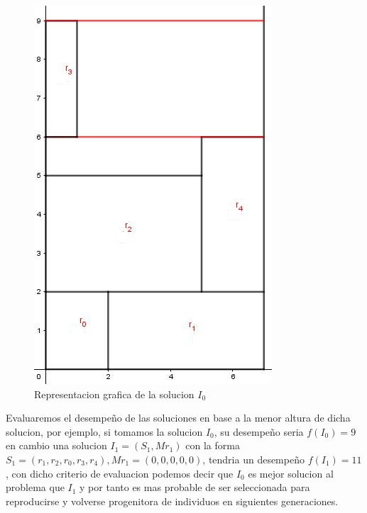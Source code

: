 \documentclass[10pt]{article}
\begin{document}
\begin{figure}[H]
\centerline{\includegraphics[width=0.7\linewidth]{grafica_ejemplo_solucion_GA.jpg}}
\caption{Representacion grafica de la solucion $I_0$}
\label{fig_1}
\end{figure}

Evaluaremos el desempeño de las soluciones en base a la menor altura de dicha solucion, por ejemplo, si tomamos la solucion $I_0$, su desempeño seria $f(I_0) = 9$ en cambio una solucion $I_1 = (S_1,Mr_1)$ con la forma $S_1 = (r_1,r_2,r_0,r_3,r_4), Mr_1 = (0,0,0,0,0)$, tendria un desempeño $f(I_1) = 11$, con dicho criterio de evaluacion podemos decir que $I_0$ es mejor solucion al problema que $I_1$ y por tanto es mas probable de ser seleccionada para reproducirse y volverse progenitora de individuos en siguientes generaciones.
\end{document}
